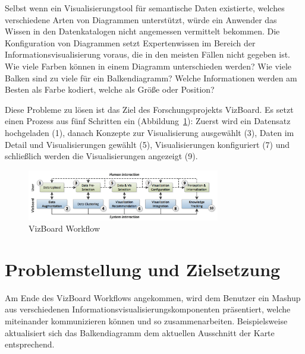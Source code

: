 \documentclass[
	headsepline,
	footsepline,
	fontsize=12pt,
	bibliography=totoc
]{scrbook}
\begin{document}

Selbst wenn ein Visualisierungstool für semantische Daten existierte, welches verschiedene Arten von Diagrammen unterstützt, würde ein Anwender das Wissen in den Datenkatalogen nicht angemessen vermittelt bekommen. Die Konfiguration von Diagrammen setzt Expertenwissen im Bereich der Informationsvisualisierung voraus, die in den meisten Fällen nicht gegeben ist. Wie viele Farben können in einem Diagramm unterschieden werden? Wie viele Balken sind zu viele für ein Balkendiagramm? Welche Informationen werden am Besten als Farbe kodiert, welche als Größe oder Position?


Diese Probleme zu lösen ist das Ziel des Forschungsprojekts VizBoard. Es setzt einen Prozess aus fünf Schritten ein (Abbildung~\ref{figure:vizboard_workflow}): Zuerst wird ein Datensatz hochgeladen (1), danach Konzepte zur Visualisierung ausgewählt (3), Daten im Detail und Visualisierungen gewählt (5), Visualisierungen konfiguriert (7) und schließlich werden die Visualisierungen angezeigt (9).

\begin{figure}[htbp]
	\centering
	\includegraphics[width=0.75\textwidth]{images/vizboard_workflow.png}
	\caption{VizBoard Workflow}
	\label{figure:vizboard_workflow}
\end{figure}

\section{Problemstellung und Zielsetzung}
\label{section:einleitung:problemstellung}



Am Ende des VizBoard Workflows angekommen, wird dem Benutzer ein Mashup aus verschiedenen Informationsvisualisierungskomponenten präsentiert, welche miteinander kommunizieren können und so zusammenarbeiten. Beispielsweise aktualisiert sich das Balkendiagramm dem aktuellen Ausschnitt der Karte entsprechend.
\end{document}
